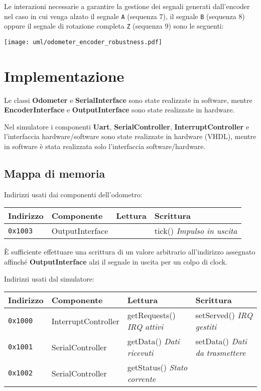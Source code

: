 \documentclass [11pt,a4paper,oneside]{paper}
\newcommand{\component}[1]{\textbf{#1}}
\newcommand{\identifier}[1]{\texttt{#1}}
\begin{document}
Le interazioni necessarie a garantire la gestione dei segnali
generati dall'encoder nel caso in cui venga alzato il segnale
\identifier{A} (sequenza 7), il segnale \identifier{B} (sequenza 8)
oppure il segnale di rotazione completa \identifier{Z} (sequenza 9)
sono le seguenti:

\begin{center}
    \texttt{[image: uml/odometer\_encoder\_robustness.pdf]}
    \label{encoder_robustness}
\end{center}


\section{Implementazione}

Le classi \component{Odometer} e \component{SerialInterface} sono state
realizzate in software, mentre \component{EncoderInterface} e
\component{OutputInterface} sono state realizzate in hardware.

Nel simulatore i componenti \component{Uart},
\component{SerialController}, \component{InterruptController} e
l'interfaccia hardware/software sono state realizzate in hardware
(VHDL), mentre in software è stata realizzata solo l'interfaccia
software/hardware.

\subsection{Mappa di memoria}

Indirizzi usati dai componenti dell'odometro:
\vspace{0.5em}

\begin{tabular}{|l|l|l|l|}
\hline
Indirizzo & Componente & Lettura & Scrittura \\
\hline
\texttt{0x1003} & OutputInterface & & tick() \textit{Impulso in uscita} \\
\hline
\end{tabular}
\vspace{1em}

È sufficiente effettuare una scrittura di un valore arbitrario
all'indirizzo assegnato affinché \component{OutputInterface}
alzi il segnale in uscita per un colpo di clock.

\vspace{1em}
Indirizzi usati dal simulatore:
\vspace{0.5em}

\begin{tabular}{|l|l|l|l|}
\hline
Indirizzo & Componente & Lettura & Scrittura \\
\hline
\texttt{0x1000} & InterruptController & getRequests() \textit{IRQ attivi}
                                      & setServed() \textit{IRQ gestiti} \\
\hline
\texttt{0x1001} & SerialController & getData() \textit{Dati ricevuti}
                                   & setData() \textit{Dati da trasmettere} \\
\hline
\texttt{0x1002} & SerialController & getStatus() \textit{Stato corrente} & \\
\hline
\end{tabular}
\end{document}
